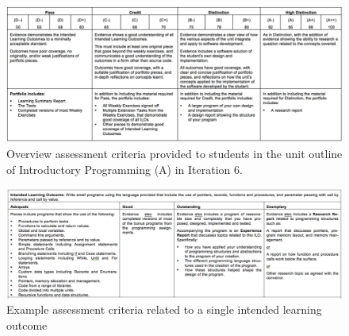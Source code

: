 \begin{figure}[p]
	\centering
	\includegraphics[width=\textwidth]{AssessmentCriteria}
	\caption{Overview assessment criteria provided to students in the unit outline of Introductory Programming (A) in Iteration 6.}
	\label{fig:i6_assessment_criteria}
\end{figure}

\begin{figure}[p]
	\centering
	\includegraphics[width=\textwidth]{AssessmentCriteriaDetail}
	\caption{Example assessment criteria related to a single intended learning outcome}
	\label{fig:i6_assessment_criteria_detail}
\end{figure}

